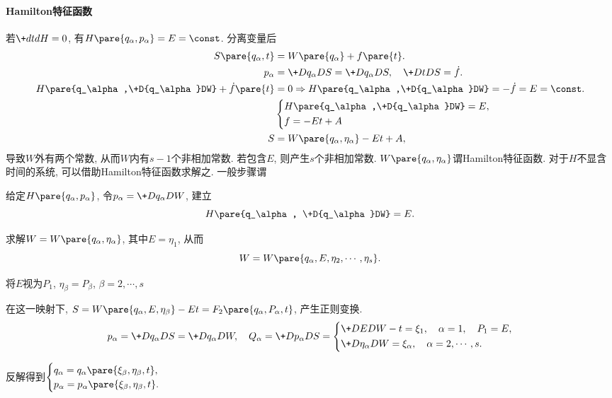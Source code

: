 \documentclass[../LectureNotes.tex]{subfiles}
\begin{document}
\paragraph{Hamilton特征函数} %
\label{par:hamilton特征函数}

若$\+dtdH = 0$, 有$H\pare{q_\alpha,p_\alpha} = E = \const$. 分离变量后
\begin{align*}
    S\pare{q_\alpha,t} &= W\pare{q_\alpha} + f\pare{t}. \\
    p_\alpha &= \+D{q_\alpha}DS = \+D{q_\alpha}DS,\quad \+DtDS = \dot{f}. \\
    H\pare{q_\alpha,\+D{q_\alpha}DW} + \dot{f}\pare{t} &= 0 \Rightarrow H\pare{q_\alpha,\+D{q_\alpha}DW} = -\dot{f} = E = \const. \\
    & \left\{\begin{aligned}
        & H\pare{q_\alpha,\+D{q_\alpha}DW} = E, \\
        & f = -Et + A
    \end{aligned}\right. \\
    S &= W\pare{q_\alpha,\eta_\alpha} - Et + A,
\end{align*}
导致$W$外有两个常数, 从而$W$内有$s-1$个非相加常数. 若包含$E$, 则产生$s$个非相加常数. $W\pare{q_\alpha,\eta_\alpha}$谓Hamilton特征函数. 对于$H$不显含时间的系统, 可以借助Hamilton特征函数求解之. 一般步骤谓
\begin{cenum}
    \item 给定$H\pare{q_\alpha,p_\alpha}$, 令$p_\alpha = \displaystyle \+D{q_\alpha}DW$, 建立
    \[ H\pare{q_\alpha, \+D{q_\alpha}DW} = E. \]
    \item 求解$W = W\pare{q_\alpha,\eta_\alpha}$, 其中$E = \eta_1$, 从而
    \[ W = W\pare{q_\alpha,E,\eta_2,\cdots,\eta_s}. \]
    \item 将$E$视为$P_1$, $\eta_\beta = P_\beta$, $\beta = 2,\cdots,s$
    \item 在这一映射下, $S = W\pare{q_\alpha,E,\eta_\beta} - Et = F_2\pare{q_\alpha,P_\alpha,t}$, 产生正则变换.
    \[ p_\alpha = \+D{q_\alpha}DS = \+D{q_\alpha}DW,\quad Q_\alpha = \+D{p_\alpha}DS = \left\{\begin{aligned}
        &\+DEDW - t = \xi_1,\quad \alpha=1,\quad P_1 = E, \\
        &\+D{\eta_\alpha}DW = \xi_\alpha,\quad \alpha = 2,\cdots, s.
    \end{aligned}\right. \]
    \item 反解得到$\displaystyle \begin{cases}
        q_\alpha = q_\alpha\pare{\xi_\beta,\eta_\beta,t}, \\
        p_\alpha = p_\alpha\pare{\xi_\beta,\eta_\beta,t}.
    \end{cases}$
\end{cenum}
\end{document}
